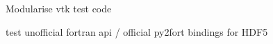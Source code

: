 
\begin{DoxyEnumerate}
\item Modularise vtk test code
\item test unofficial fortran api / official py2fort bindings for H\+D\+F5 
\end{DoxyEnumerate}